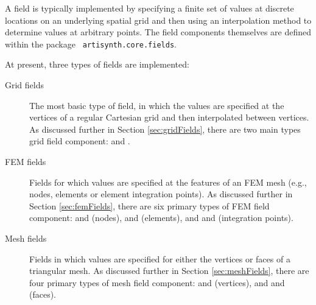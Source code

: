 A field is typically implemented by specifying a finite set of values
at discrete locations on an underlying spatial grid and then using an
interpolation method to determine values at arbitrary points. The
field components themselves are defined within the package {\tt
artisynth.core.fields}.

At present, three types of fields are implemented:

\begin{description}

\item[Grid fields]\mbox{}

The most basic type of field, in which the values are specified at the
vertices of a regular Cartesian grid and then interpolated between
vertices. As discussed further in Section \ref{sec:gridFields}, there
are two main types grid field component:
 and
.

\item[FEM fields]\mbox{}

Fields for which values are specified at the features of an FEM mesh
(e.g., nodes, elements or element integration points).  As discussed
further in Section \ref{sec:femFields}, there are six primary types of
FEM field component:
and
(nodes),
and
(elements), and
and
(integration points).

\item[Mesh fields]\mbox{}

Fields in which values are specified for either the vertices or faces
of a triangular mesh. As discussed
further in Section \ref{sec:meshFields}, there are four primary types of
mesh field component:
and
(vertices), and 
and
(faces).

\end{description}

